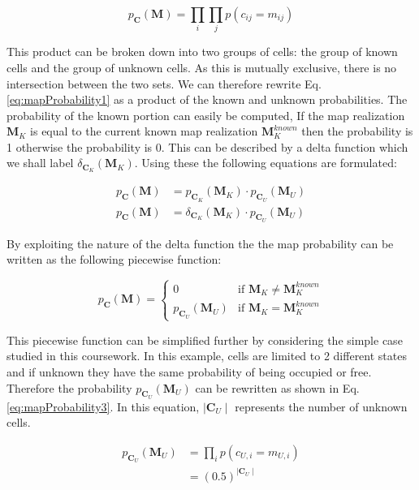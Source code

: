 \documentclass[a4paper,12pt]{article}
\begin{document}
			\begin{equation}
				p_\textbf{C}(\textbf{M}) = \prod_{i} \prod_{j} p(c_{ij} = m_{ij})
				\label{eq:mapProbability1}
			\end{equation}
			
			This product can be broken down into two groups of cells: the group of known cells and the group of unknown cells. As this is mutually exclusive, there is no intersection between the two sets. We can therefore rewrite Eq. \ref{eq:mapProbability1} as a product of the known and unknown probabilities. The probability of the known portion can easily be computed, If the map realization $\textbf{M}_K$ is equal to the current known map realization $\textbf{M}_K^{known}$ then the probability is 1 otherwise the probability is 0. This can be described by a delta function which we shall label $\delta_{\textbf{C}_K}(\textbf{M}_K)$. Using these the following equations are formulated:

			\begin{equation}
				\begin{split}
					p_\textbf{C}(\textbf{M}) &= p_{\textbf{C}_K}(\textbf{M}_K) \cdot p_{\textbf{C}_U}(\textbf{M}_U) \\
					p_\textbf{C}(\textbf{M}) &= \delta_{\textbf{C}_K}(\textbf{M}_K) \cdot p_{\textbf{C}_U}(\textbf{M}_U) 
				\end{split}
				\label{eq:mapProbability2}
			\end{equation}

			By exploiting the nature of the delta function the the map probability can be written as the following piecewise function:

			\[
				p_\textbf{C}(\textbf{M}) =
				\begin{cases}
					0 										& \text{if $\textbf{M}_K \neq \textbf{M}_K^{known}$} \\
					p_{\textbf{C}_U}(\textbf{M}_U) 			& \text{if $\textbf{M}_K = \textbf{M}_K^{known}$} 
				\end{cases}
			\]
			
			This piecewise function can be simplified further by considering the simple case studied in this coursework. In this example, cells are limited to 2 different states and if unknown they have the same probability of being occupied or free. Therefore the probability $p_{\textbf{C}_U}(\textbf{M}_U)$ can be rewritten as shown in Eq. \ref{eq:mapProbability3}. In this equation, $\mid \textbf{C}_U \mid$ represents the number of unknown cells. 

			\begin{equation}
				\begin{split}
					p_{\textbf{C}_U}(\textbf{M}_U) &= \prod_{i} p(c_{U,i} = m_{U,i}) \\
					&= \left(0.5\right)^{\mid \textbf{C}_U \mid}
				\end{split}
				\label{eq:mapProbability3}
			\end{equation}
\end{document}

